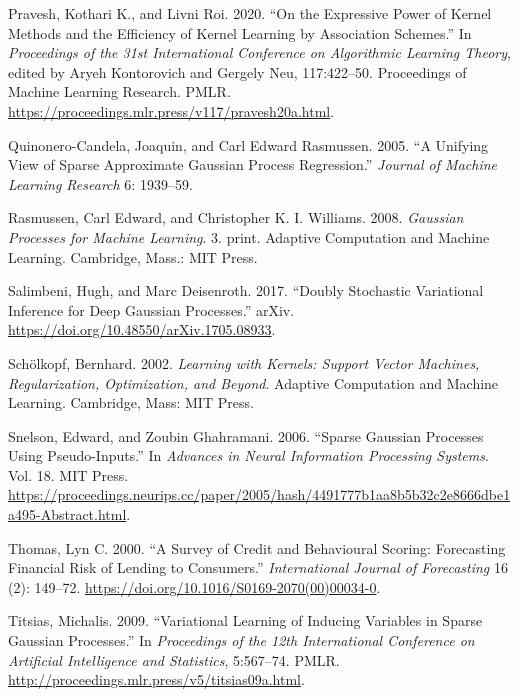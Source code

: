\documentclass[
  letterpaper,
  DIV=11,
  numbers=noendperiod]{scrartcl}
\newlength{\cslhangindent}
\newenvironment{CSLReferences}[2] %
 {\begin{list}{}{%
  \setlength{\itemindent}{0pt}
  \setlength{\leftmargin}{0pt}
  \setlength{\parsep}{0pt}
  \ifodd #1
   \setlength{\leftmargin}{\cslhangindent}
   \setlength{\itemindent}{-1\cslhangindent}
  \fi
  \setlength{\itemsep}{#2\baselineskip}}}
 {\end{list}}
\begin{document}
\begin{CSLReferences}{1}{0}
Pravesh, Kothari K., and Livni Roi. 2020. {``On the Expressive Power of
Kernel Methods and the Efficiency of Kernel Learning by Association
Schemes.''} In \emph{Proceedings of the 31st International Conference on
Algorithmic Learning Theory}, edited by Aryeh Kontorovich and Gergely
Neu, 117:422--50. Proceedings of Machine Learning Research. PMLR.
\url{https://proceedings.mlr.press/v117/pravesh20a.html}.

Quinonero-Candela, Joaquin, and Carl Edward Rasmussen. 2005. {``A
Unifying View of Sparse Approximate {Gaussian} Process Regression.''}
\emph{Journal of Machine Learning Research} 6: 1939--59.

Rasmussen, Carl Edward, and Christopher K. I. Williams. 2008.
\emph{Gaussian Processes for Machine Learning}. 3. print. Adaptive
Computation and Machine Learning. Cambridge, Mass.: MIT Press.

Salimbeni, Hugh, and Marc Deisenroth. 2017. {``Doubly {Stochastic}
{Variational} {Inference} for {Deep} {Gaussian} {Processes}.''} arXiv.
\url{https://doi.org/10.48550/arXiv.1705.08933}.

Schölkopf, Bernhard. 2002. \emph{Learning with Kernels: Support Vector
Machines, Regularization, Optimization, and Beyond}. Adaptive
Computation and Machine Learning. Cambridge, Mass: MIT Press.

Snelson, Edward, and Zoubin Ghahramani. 2006. {``Sparse {Gaussian}
{Processes} Using {Pseudo}-Inputs.''} In \emph{Advances in {Neural}
{Information} {Processing} {Systems}}. Vol. 18. MIT Press.
\url{https://proceedings.neurips.cc/paper/2005/hash/4491777b1aa8b5b32c2e8666dbe1a495-Abstract.html}.

Thomas, Lyn C. 2000. {``A Survey of Credit and Behavioural Scoring:
Forecasting Financial Risk of Lending to Consumers.''}
\emph{International Journal of Forecasting} 16 (2): 149--72.
\url{https://doi.org/10.1016/S0169-2070(00)00034-0}.

Titsias, Michalis. 2009. {``Variational {Learning} of {Inducing}
{Variables} in {Sparse} {Gaussian} {Processes}.''} In \emph{Proceedings
of the 12th {International} {Conference} on {Artificial} {Intelligence}
and {Statistics}}, 5:567--74. PMLR.
\url{http://proceedings.mlr.press/v5/titsias09a.html}.


\end{CSLReferences}
\end{document}
